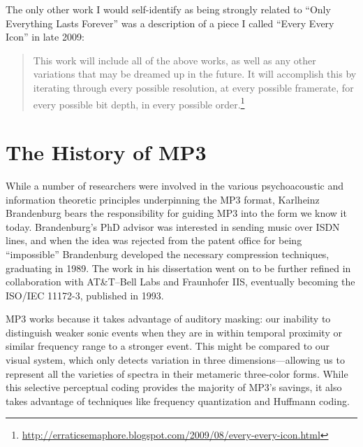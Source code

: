 \documentclass{thesis}
\begin{document}
The only other work I would self-identify as being strongly related to ``Only Everything Lasts Forever'' was a description of a piece I called ``Every Every Icon'' in late 2009:
	
	\begin{quote}
	This work will include all of the above works, as well as any other variations that may be dreamed up in the future. It will accomplish this by iterating through every possible resolution, at every possible framerate, for every possible bit depth, in every possible order.\footnote{\url{http://erraticsemaphore.blogspot.com/2009/08/every-every-icon.html}}
	\end{quote}	

\section{The History of MP3}

While a number of researchers were involved in the various psychoacoustic and information theoretic principles underpinning the MP3 format, Karlheinz Brandenburg bears the responsibility for guiding MP3 into the form we know it today. Brandenburg's PhD advisor was interested in sending music over ISDN lines, and when the idea was rejected from the patent office for being ``impossible'' Brandenburg developed the necessary compression techniques, graduating in 1989\cite{brandenburg_interviews_2004}. The work in his dissertation went on to be further refined in collaboration with AT\&T--Bell Labs and Fraunhofer IIS, eventually becoming the ISO/IEC 11172-3, published in 1993.

MP3 works because it takes advantage of auditory masking: our inability to distinguish weaker sonic events when they are in within temporal proximity or similar frequency range to a stronger event.\cite{Ruckert05} This might be compared to our visual system, which only detects variation in three dimensions---allowing us to represent all the varieties of spectra in their metameric three-color forms. While this selective perceptual coding provides the majority of MP3's savings, it also takes advantage of techniques like frequency quantization and Huffmann coding.
\end{document}
